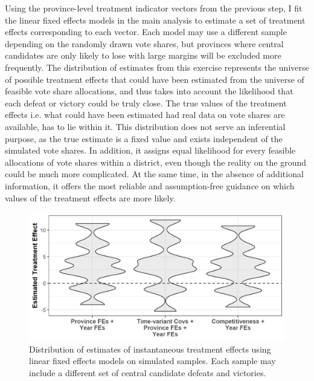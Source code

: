 \documentclass[12pt]{article}
\newcommand{\1}{\mathbbm{1}}
\begin{document}
Using the province-level treatment indicator vectors from the previous step, I fit the linear fixed effects models in the main analysis to estimate a set of treatment effects corresponding to each vector. Each model may use a different sample depending on the randomly drawn vote shares, but provinces where central candidates are only likely to lose with large margins will be excluded more frequently. The distribution of estimates from this exercise represents the universe of possible treatment effects that could have been estimated from the universe of feasible vote share allocations, and thus takes into account the likelihood that each defeat or victory could be truly close. The true values of the treatment effects i.e. what could have been estimated had real data on vote shares are available, has to lie within it. This distribution does not serve an inferential purpose, as the true estimate is a fixed value and exists independent of the simulated vote shares. In addition, it assigns equal likelihood for every feasible allocations of vote shares within a district, even though the reality on the ground could be much more complicated. At the same time, in the absence of additional information, it offers the most reliable and assumption-free guidance on which values of the treatment effects are more likely.

\begin{figure}[!htbp]
	\centering
	\includegraphics[width=.75\textwidth]{figure/200202_impute_results_2011.png}
	\captionsetup{singlelinecheck=off}
	\caption[Estimated linear fixed effects treatment effects using simulated vote shares]{Distribution of estimates of instantaneous treatment effects using linear fixed effects models on simulated samples. Each sample may include a different set of central candidate defeats and victories.}
	\label{fig:impute_results_2011}
\end{figure}
\end{document}
